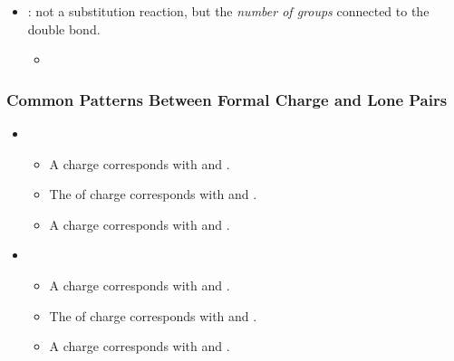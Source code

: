 \begin{itemize}
\begin{itemize}
    \item {}: not a substitution reaction, but the \emph{number of groups} connected to the double bond.
    \begin{itemize}
      \item 
      
        \qquad
        \qquad
        \qquad
        \bigskip
        
    \end{itemize}
  \end{itemize}
  \subsubsection{Common Patterns Between Formal Charge and Lone Pairs}
    \begin{itemize}
        \item {}
            \begin{itemize}
                \item A  charge corresponds with  and .
                \item The  of charge corresponds with  and .
                \item A  charge corresponds with  and .
            \end{itemize}
        \item {}
            \begin{itemize}
                \item A  charge corresponds with  and .
                \item The  of charge corresponds with  and .
                \item A  charge corresponds with  and .
            \end{itemize}
    \end{itemize}


\end{itemize}
